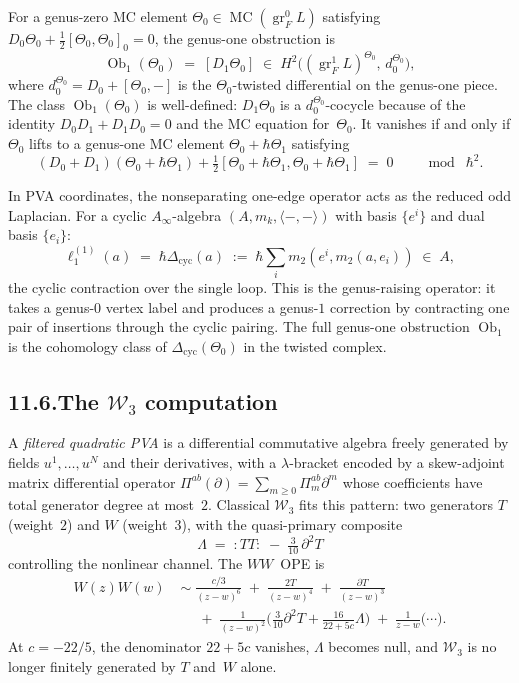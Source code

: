 \documentclass[11pt]{report}
\theoremstyle{definition}
\theoremstyle{remark}
\numberwithin{equation}{section}
\begin{document}
For a genus-zero MC element $\Theta_0\in\operatorname{MC}(\operatorname{gr}^0_F L)$
satisfying $D_0\Theta_0+\tfrac12[\Theta_0,\Theta_0]_0=0$,
the genus-one obstruction is
\[
\operatorname{Ob}_1(\Theta_0)
\;=\;
[D_1\Theta_0]
\;\in\;
H^2\!\bigl((\operatorname{gr}^1_F L)^{\Theta_0},\,d_0^{\Theta_0}\bigr),
\]
where $d_0^{\Theta_0}=D_0+[\Theta_0,-]$ is the $\Theta_0$-twisted
differential on the genus-one piece. The class
$\operatorname{Ob}_1(\Theta_0)$ is well-defined:
$D_1\Theta_0$ is a $d_0^{\Theta_0}$-cocycle because of the
identity $D_0 D_1+D_1 D_0=0$ and the MC equation for~$\Theta_0$.
It vanishes if and only if $\Theta_0$ lifts to a genus-one MC
element $\Theta_0+\hbar\Theta_1$ satisfying
\[
(D_0+D_1)(\Theta_0+\hbar\Theta_1)
+\tfrac12[\Theta_0+\hbar\Theta_1,\Theta_0+\hbar\Theta_1]
\;=\;0
\qquad\bmod\;\hbar^2.
\]

In PVA coordinates, the nonseparating one-edge operator acts as
the reduced odd Laplacian. For a cyclic $A_\infty$-algebra
$(A,m_k,\langle-,-\rangle)$ with basis $\{e^i\}$ and dual
basis $\{e_i\}$:
\[
\ell_1^{(1)}(a)
\;=\;
\hbar\Delta_{\mathrm{cyc}}(a)
\;:=\;
\hbar\sum_{i}m_2(e^i,m_2(a,e_i))
\;\in\;
A,
\]
the cyclic contraction over the single loop. This is the
genus-raising operator: it takes a genus-$0$ vertex label and
produces a genus-$1$ correction by contracting one pair of
insertions through the cyclic pairing. The full genus-one
obstruction $\operatorname{Ob}_1$ is the cohomology class of
$\Delta_{\mathrm{cyc}}(\Theta_0)$ in the twisted complex.

\subsection*{11.6.\enspace The $\mathcal W_3$ computation}

A \emph{filtered quadratic PVA} is a differential commutative
algebra freely generated by fields $u^1,\ldots,u^N$ and their
derivatives, with a $\lambda$-bracket encoded by a skew-adjoint
matrix differential operator
$\Pi^{ab}(\partial)=\sum_{m\ge 0}\Pi^{ab}_m\partial^m$ whose
coefficients have total generator degree at most~$2$. Classical
$\mathcal W_3$ fits this pattern: two generators $T$
(weight~$2$) and $W$ (weight~$3$), with the quasi-primary
composite
\[
\Lambda\;=\;{:}TT{:}\;-\;\tfrac{3}{10}\,\partial^2 T
\]
controlling the nonlinear channel. The $WW$~OPE is
\begin{align*}
W(z)W(w)
\;&\sim\;
\frac{c/3}{(z-w)^6}
\;+\;
\frac{2T}{(z-w)^4}
\;+\;
\frac{\partial T}{(z-w)^3}\\
&\quad\;+\;
\frac{1}{(z-w)^2}\biggl(\tfrac{3}{10}\partial^2 T
+\frac{16}{22+5c}\Lambda\biggr)
\;+\;
\frac{1}{z-w}\biggl(\cdots\biggr).
\end{align*}
At $c=-22/5$, the denominator $22+5c$ vanishes, $\Lambda$
becomes null, and $\mathcal W_3$ is no longer finitely generated
by $T$ and~$W$ alone.
\end{document}

